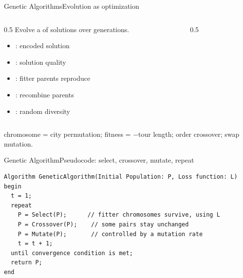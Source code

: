 \documentclass[aspectratio=169,11pt]{beamer}
\begin{document}
\begin{frame}{Genetic Algorithms}{Evolution as optimization}
  \begin{columns}[T]
    \begin{column}{0.5\textwidth}
      Evolve a  of solutions over generations.
      \begin{itemize}\small
        \item {}: encoded solution
        \item {}: solution quality
        \item {}: fitter parents reproduce
        \item {}: recombine parents
        \item {}: random diversity
      \end{itemize}
    \end{column}
    \begin{column}{0.5\textwidth}
      \begin{center}
      \end{center}
    \end{column}
  \end{columns}
  \vspace{0.2em}
  \begin{center}\scriptsize
     chromosome = city permutation; fitness = $-$tour length;
    order crossover; swap mutation.
  \end{center}
\end{frame}

\begin{frame}[fragile]{Genetic Algorithm}{Pseudocode: select, crossover, mutate, repeat}
\begin{lstlisting}[language={}, basicstyle=\ttfamily\scriptsize, numbers=none,
                   xleftmargin=0.5em, framexleftmargin=0.5em]
Algorithm GeneticAlgorithm(Initial Population: P, Loss function: L)
begin
  t = 1;
  repeat
    P = Select(P);      // fitter chromosomes survive, using L
    P = Crossover(P);    // some pairs stay unchanged
    P = Mutate(P);       // controlled by a mutation rate
    t = t + 1;
  until convergence condition is met;
  return P;
end
\end{lstlisting}
\end{frame}
\end{document}
